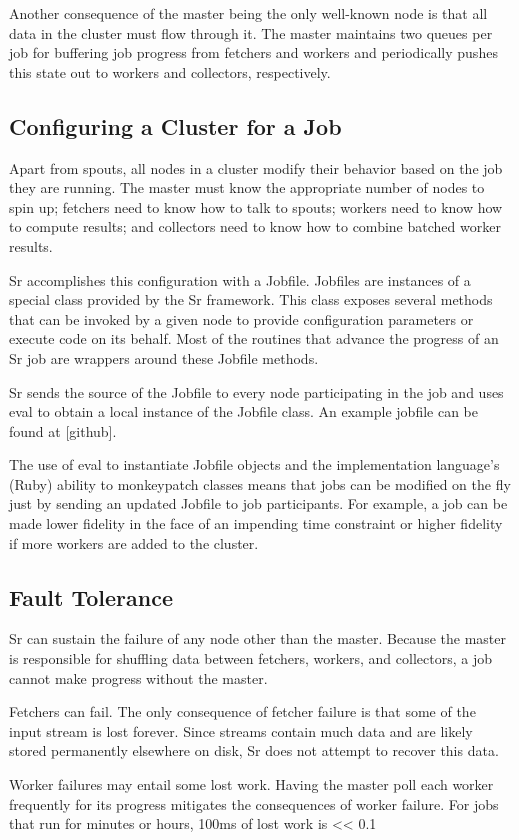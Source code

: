 \documentclass[12pt]{article}
\begin{document}
Another consequence of the master being the only well-known node is that all data in the cluster must flow through it. The master maintains two queues per job for buffering job progress from fetchers and workers and periodically pushes this state out to workers and collectors, respectively.
\subsection{Configuring a Cluster for a Job}
Apart from spouts, all nodes in a cluster modify their behavior based on the job they are running. The master must know the appropriate number of nodes to spin up; fetchers need to know how to talk to spouts; workers need to know how to compute results; and collectors need to know how to combine batched worker results.

Sr accomplishes this configuration with a Jobfile. Jobfiles are instances of a special class provided by the Sr framework. This class exposes several methods that can be invoked by a given node to provide configuration parameters or execute code on its behalf. Most of the routines that advance the progress of an Sr job are wrappers around these Jobfile methods.

Sr sends the source of the Jobfile to every node participating in the job and uses eval to obtain a local instance of the Jobfile class. An example jobfile can be found at [github].

The use of eval to instantiate Jobfile objects and the implementation language’s (Ruby) ability to monkeypatch classes means that jobs can be modified on the fly just by sending an updated Jobfile to job participants. For example, a job can be made lower fidelity in the face of an impending time constraint or higher fidelity if more workers are added to the cluster.
\subsection{Fault Tolerance}
Sr can sustain the failure of any node other than the master. Because the master is responsible for shuffling data between fetchers, workers, and collectors, a job cannot make progress without the master.

Fetchers can fail. The only consequence of fetcher failure is that some of the input stream is lost forever. Since streams contain much data and are likely stored permanently elsewhere on disk, Sr does not attempt to recover this data.

Worker failures may entail some lost work. Having the master poll each worker frequently for its progress mitigates the consequences of worker failure. For jobs that run for minutes or hours, 100ms of lost work is << 0.1%
\end{document}

